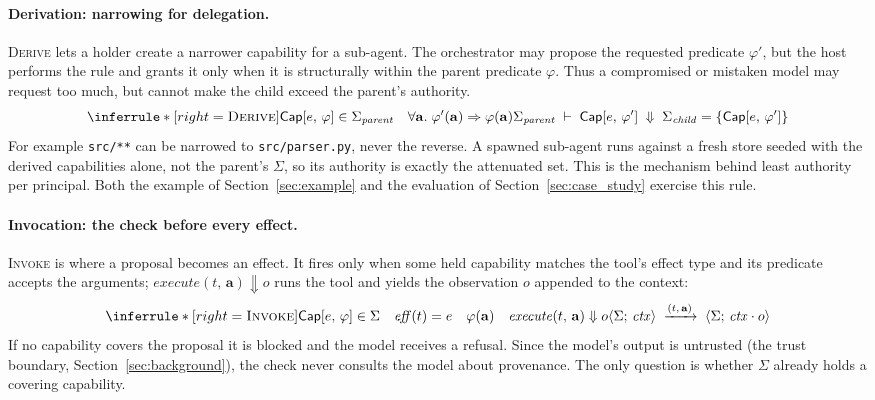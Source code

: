 \documentclass[sigplan,review,anonymous]{acmart}
\renewcommand{\Cap}[2]{\textsf{Cap}[{#1},\,{#2}]}
\newcommand{\rulename}[1]{\textsc{#1}}
\begin{document}
  \paragraph{Derivation: narrowing for delegation.}
  \rulename{Derive} lets a holder create a narrower capability for a
  sub-agent. The orchestrator may propose the requested predicate
  $\varphi'$, but the host performs the rule and grants it only when it is
  structurally within the parent predicate $\varphi$. Thus a compromised or
  mistaken model may request too much, but cannot make the child exceed the
  parent's authority.
  \[
    \inferrule*[right=\rulename{Derive}]{
      \Cap{e}{\varphi} \in \Sigma_{\mathit{parent}} \quad
      \forall \mathbf{a}.\; \varphi'(\mathbf{a}) \Rightarrow \varphi(\mathbf{a})
    }{
      \Sigma_{\mathit{parent}}
      \;\vdash\;
      \Cap{e}{\varphi'}
      \;\Downarrow\;
      \Sigma_{\mathit{child}}=\{\Cap{e}{\varphi'}\}
    }
  \]
  For example \texttt{src/**} can be narrowed to \texttt{src/parser.py}, never
  the reverse. A spawned sub-agent runs against a fresh store seeded with the
  derived capabilities alone, not the parent's $\Sigma$, so its authority is
  exactly the attenuated set. This is the mechanism behind least authority
  per principal. Both the example of Section~\ref{sec:example} and the
  evaluation of Section~\ref{sec:case_study} exercise this rule.
  
  \paragraph{Invocation: the check before every effect.}
  \rulename{Invoke} is where a proposal becomes an effect. It fires only when
  some held capability matches the tool's effect type and its predicate
  accepts the arguments; $\mathit{execute}(t,\,\mathbf{a}) \Downarrow o$ runs
  the tool and yields the observation $o$ appended to the context:
  \[
    \inferrule*[right=\rulename{Invoke}]{
      \Cap{e}{\varphi} \in \Sigma \quad
      \mathit{eff}(t) = e \quad
      \varphi(\mathbf{a}) \quad
      \mathit{execute}(t,\,\mathbf{a}) \Downarrow o
    }{
      \langle \Sigma;\, \mathit{ctx} \rangle
      \;\xrightarrow{(t,\,\mathbf{a})}\;
      \langle \Sigma;\, \mathit{ctx} \cdot o \rangle
    }
  \]
  If no capability covers the proposal it is blocked and the model receives a
  refusal. Since the model's output is untrusted (the trust boundary, Section~\ref{sec:background}),
  the check never consults the model about provenance. The only question is
  whether $\Sigma$ already holds a covering capability.
  
\end{document}
